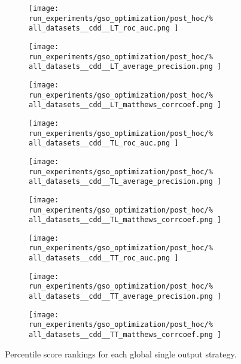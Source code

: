 \begin{figure*}
    \centering
    \begin{subfigure}{0.32\textwidth}
        \texttt{[image: 
            run\_experiments/gso\_optimization/post\_hoc/\%
            all\_datasets\_\_cdd\_\_LT\_roc\_auc.png
        ]}
    \end{subfigure}
    \begin{subfigure}{0.32\textwidth}
        \texttt{[image: 
            run\_experiments/gso\_optimization/post\_hoc/\%
            all\_datasets\_\_cdd\_\_LT\_average\_precision.png
        ]}
    \end{subfigure}
    \begin{subfigure}{0.32\textwidth}
        \texttt{[image: 
            run\_experiments/gso\_optimization/post\_hoc/\%
            all\_datasets\_\_cdd\_\_LT\_matthews\_corrcoef.png
        ]}
    \end{subfigure}

    \begin{subfigure}{0.32\textwidth}
        \texttt{[image: 
            run\_experiments/gso\_optimization/post\_hoc/\%
            all\_datasets\_\_cdd\_\_TL\_roc\_auc.png
        ]}
    \end{subfigure}
    \begin{subfigure}{0.32\textwidth}
        \texttt{[image: 
            run\_experiments/gso\_optimization/post\_hoc/\%
            all\_datasets\_\_cdd\_\_TL\_average\_precision.png
        ]}
    \end{subfigure}
    \begin{subfigure}{0.32\textwidth}
        \texttt{[image: 
            run\_experiments/gso\_optimization/post\_hoc/\%
            all\_datasets\_\_cdd\_\_TL\_matthews\_corrcoef.png
        ]}
    \end{subfigure}

    \begin{subfigure}{0.32\textwidth}
        \texttt{[image: 
            run\_experiments/gso\_optimization/post\_hoc/\%
            all\_datasets\_\_cdd\_\_TT\_roc\_auc.png
        ]}
    \end{subfigure}
    \begin{subfigure}{0.32\textwidth}
        \texttt{[image: 
            run\_experiments/gso\_optimization/post\_hoc/\%
            all\_datasets\_\_cdd\_\_TT\_average\_precision.png
        ]}
    \end{subfigure}
    \begin{subfigure}{0.32\textwidth}
        \texttt{[image: 
            run\_experiments/gso\_optimization/post\_hoc/\%
            all\_datasets\_\_cdd\_\_TT\_matthews\_corrcoef.png
        ]}
    \end{subfigure}
    \caption{Percentile score rankings for each global single output strategy.}
    \label{fig:cdd_gso_models}
\end{figure*}

